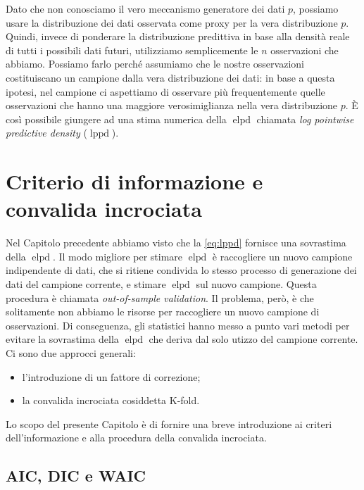 \documentclass[
  11pt,
]{krantz}
\providecommand{\tightlist}{%
  \setlength{\itemsep}{0pt}\setlength{\parskip}{0pt}}
\DeclareMathOperator{\elpd}{elpd} %
\DeclareMathOperator{\lppd}{lppd} %
\theoremstyle{definition}
\theoremstyle{definition}
\theoremstyle{definition}
\theoremstyle{definition}
\theoremstyle{remark}
\begin{document}
Dato che non conosciamo il vero meccanismo generatore dei dati \(p\), possiamo usare la distribuzione dei dati osservata come proxy per la vera distribuzione \(p\). Quindi, invece di ponderare la distribuzione predittiva in base alla densità reale di tutti i possibili dati futuri, utilizziamo semplicemente le \(n\) osservazioni che abbiamo. Possiamo farlo perché assumiamo che le nostre osservazioni costituiscano un campione dalla vera distribuzione dei dati: in base a questa ipotesi, nel campione ci aspettiamo di osservare più frequentemente quelle osservazioni che hanno una maggiore verosimiglianza nella vera distribuzione \(p\). È così possibile giungere ad una stima numerica della \(\elpd\) chiamata \emph{log pointwise predictive density} (\(\lppd\)).

\hypertarget{ch:info-criterion}{%
\chapter{Criterio di informazione e convalida incrociata}\label{ch:info-criterion}}

Nel Capitolo precedente abbiamo visto che la \eqref{eq:lppd} fornisce una sovrastima della \(\elpd\). Il modo migliore per stimare \(\elpd\) è raccogliere un nuovo campione indipendente di dati, che si ritiene condivida lo stesso processo di generazione dei dati del campione corrente, e stimare \(\elpd\) sul nuovo campione. Questa procedura è chiamata \emph{out-of-sample validation}. Il problema, però, è che solitamente non abbiamo le risorse per raccogliere un nuovo campione di osservazioni. Di conseguenza, gli statistici hanno messo a punto vari metodi per evitare la sovrastima della \(\elpd\) che deriva dal solo utizzo del campione corrente. Ci sono due approcci generali:

\begin{itemize}
\tightlist
\item
  l'introduzione di un fattore di correzione;
\item
  la convalida incrociata cosiddetta K-fold.
\end{itemize}

Lo scopo del presente Capitolo è di fornire una breve introduzione ai criteri dell'informazione e alla procedura della convalida incrociata.

\hypertarget{aic-dic-e-waic}{%
\section{AIC, DIC e WAIC}\label{aic-dic-e-waic}}
\end{document}
